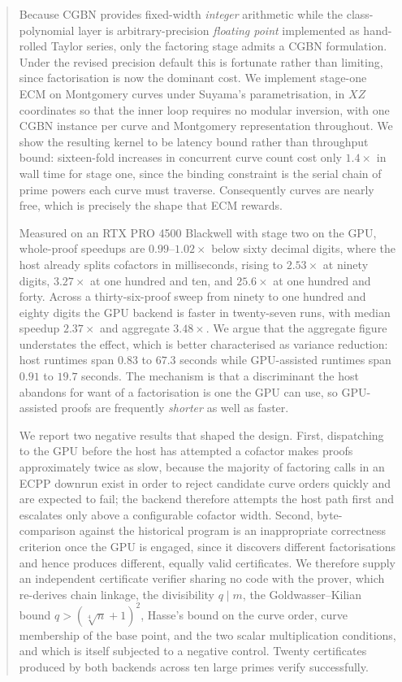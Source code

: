\documentclass[11pt,a4paper]{article}
\begin{document}
\begin{abstract}
Because CGBN provides fixed-width \emph{integer} arithmetic while the
class-polynomial layer is arbitrary-precision \emph{floating point}
implemented as hand-rolled Taylor series, only the factoring stage admits
a CGBN formulation. Under the revised precision default this is
fortunate rather than limiting, since factorisation is now the dominant
cost. We implement stage-one ECM on Montgomery curves under Suyama's
parametrisation, in $XZ$ coordinates so that the inner loop requires no
modular inversion, with one CGBN instance per curve and Montgomery
representation throughout. We show the resulting kernel to be latency
bound rather than throughput bound: sixteen-fold increases in
concurrent curve count cost only $1.4\times$ in wall time for stage one, since the
binding constraint is the serial chain of prime powers each curve must
traverse. Consequently curves are nearly free, which is precisely the
shape that ECM rewards.

Measured on an RTX PRO 4500 Blackwell with stage two on the GPU, whole-proof
speedups are $0.99$--$1.02\times$ below sixty decimal digits, where the host
already splits cofactors in milliseconds, rising to $2.53\times$ at ninety
digits, $3.27\times$ at one hundred and ten, and $25.6\times$ at one hundred
and forty. Across a thirty-six-proof sweep from ninety to one hundred and
eighty digits the GPU backend is faster in twenty-seven runs, with median
speedup $2.37\times$ and aggregate $3.48\times$. We argue that the aggregate
figure understates the effect, which is better characterised as variance
reduction: host runtimes span $0.83$ to $67.3$ seconds while
GPU-assisted runtimes span $0.91$ to $19.7$ seconds. The mechanism is that a discriminant the host
abandons for want of a factorisation is one the GPU can use, so
GPU-assisted proofs are frequently \emph{shorter} as well as faster.

We report two negative results that shaped the design. First, dispatching
to the GPU before the host has attempted a cofactor makes proofs
approximately twice as slow, because the majority of factoring calls in
an ECPP downrun exist in order to reject candidate curve orders quickly
and are expected to fail; the backend therefore attempts the host path
first and escalates only above a configurable cofactor width. Second,
byte-comparison against the historical program is an inappropriate
correctness criterion once the GPU is engaged, since it discovers
different factorisations and hence produces different, equally valid
certificates. We therefore supply an independent certificate verifier
sharing no code with the prover, which re-derives chain linkage, the
divisibility $q \mid m$, the Goldwasser--Kilian bound $q > (\sqrt[4]{n}+1)^2$,
Hasse's bound on the curve order, curve membership of the base point, and
the two scalar multiplication conditions, and which is itself subjected
to a negative control. Twenty certificates produced by both backends
across ten large primes verify successfully.


\end{abstract}
\end{document}

